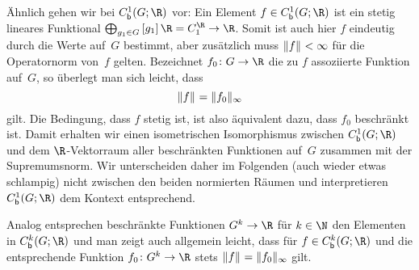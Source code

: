 Ähnlich gehen wir bei $\Cb^1(G;\R)$ vor: Ein Element $f\in\Cb^1(G;\R)$ ist ein
stetig lineares Funktional $\bigoplus_{g_1\in G}\, [g_1]\,\R = C_1^{\R} \to \R$.
Somit ist auch hier $f$ eindeutig durch die Werte auf~$G$ bestimmt, aber
zusätzlich muss $\lVert f\rVert_{} < \infty$ für die Operatornorm von~$f$ gelten.
Bezeichnet $f_0\colon G\to\R$ die zu $f$ assoziierte Funktion auf~$G$, so
überlegt man sich leicht, dass
\[ \lVert f\rVert_{} = \lVert f_0\rVert_\infty \]
gilt. Die Bedingung, dass $f$ stetig ist, ist also äquivalent dazu, dass
$f_0$ beschränkt ist. Damit erhalten wir einen isometrischen Isomorphismus
zwischen $\Cb^1(G;\R)$ und dem $\R$-Vektorraum aller beschränkten Funktionen
auf~$G$ zusammen mit der Supremumsnorm. Wir unterscheiden daher im Folgenden
(auch wieder etwas schlampig) nicht zwischen den beiden normierten Räumen und
interpretieren $\Cb^1(G;\R)$ dem Kontext entsprechend.

Analog entsprechen beschränkte Funktionen $G^k\to\R$ für $k\in\N$ den Elementen
in $\Cb^k(G;\R)$ und man zeigt auch allgemein leicht, dass für $f\in\Cb^k(G;\R)$
und die entsprechende Funktion $f_0\colon G^k\to\R$ stets
$\lVert f\rVert_{} = \lVert f_0\rVert_\infty$ gilt.
